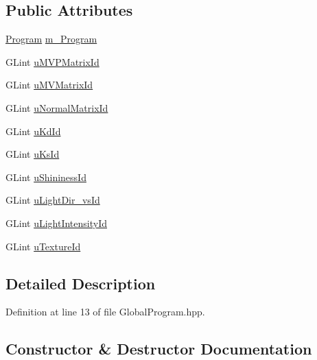 \subsection*{Public Attributes}
\begin{DoxyCompactItemize}
\item 
\hyperlink{classglimac_1_1_program}{Program} \hyperlink{class_global_program_aeeb4dcb6959f5d9cd5866170f4641891}{m\+\_\+\+Program}
\item 
G\+Lint \hyperlink{class_global_program_ab05d58bef4173189be8db77dd5be93a8}{u\+M\+V\+P\+Matrix\+Id}
\item 
G\+Lint \hyperlink{class_global_program_a8c4672441428d846bb1c6e793eafc2d1}{u\+M\+V\+Matrix\+Id}
\item 
G\+Lint \hyperlink{class_global_program_a1c670568aed30d2096a274f30e713654}{u\+Normal\+Matrix\+Id}
\item 
G\+Lint \hyperlink{class_global_program_aa57c5d88e8ebbc7c9673c5515529d822}{u\+Kd\+Id}
\item 
G\+Lint \hyperlink{class_global_program_a2bbd0ba4c150c90f4f6ea4f3a31f725f}{u\+Ks\+Id}
\item 
G\+Lint \hyperlink{class_global_program_a79fdb2124d3393778694f681c8c0fd10}{u\+Shininess\+Id}
\item 
G\+Lint \hyperlink{class_global_program_a840bb7c9ef798eff0a61083c8167ea01}{u\+Light\+Dir\+\_\+vs\+Id}
\item 
G\+Lint \hyperlink{class_global_program_a2a09f5d29fcb6912336de7b7807dc96f}{u\+Light\+Intensity\+Id}
\item 
G\+Lint \hyperlink{class_global_program_acc93e858962fe32a28f22fe73a439c7d}{u\+Texture\+Id}
\end{DoxyCompactItemize}


\subsection{Detailed Description}


Definition at line 13 of file Global\+Program.\+hpp.



\subsection{Constructor \& Destructor Documentation}
\mbox{\label{class_global_program_ab5e0c2e652b403ac3266d91a0a315532}} 
